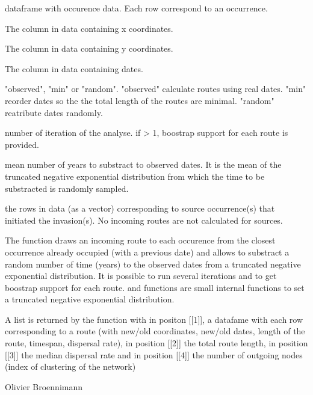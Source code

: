 \documentclass[a4paper]{book}
\begin{document}
\begin{Arguments}
\begin{ldescription}
\item[\code{data}] dataframe with occurence data. Each row correspond to an occurrence.
\item[\code{xcol}] The column in data containing x coordinates.
\item[\code{ycol}] The column in data containing y coordinates.
\item[\code{datecol}] The column in data containing dates.
\item[\code{mode}] "observed", "min" or "random". "observed" calculate routes using real dates. "min" reorder dates so the the total length of the routes are minimal. "random" reatribute dates randomly.
\item[\code{rep}] number of iteration of the analyse. if > 1, boostrap support for each route is provided.
\item[\code{mean.date.error}] mean number of years to substract to observed dates. It is the mean of the truncated negative exponential distribution from which the time to be substracted is randomly sampled.
\item[\code{fixed.sources.rows}] the rows in data (as a vector) corresponding to source occurrence(s) that initiated the invasion(s). No incoming routes are not calculated for sources.
\end{ldescription}
\end{Arguments}
%
\begin{Details}\relax
The function draws an incoming route to each occurence from the closest occurrence already occupied (with a previous date) and allows to substract a random number of time (years) to the observed dates from a truncated negative exponential distribution. It is possible to run several iterations and to get boostrap support for each route.
 and  functions are small internal functions to set a truncated negative exponential distribution.
\end{Details}
%
\begin{Value}
A list is returned by the function with in positon [[1]], a datafame with each row corresponding to a route (with new/old coordinates, new/old dates, length of the route, timespan, dispersal rate), in position [[2]] the total route length, in position [[3]] the median dispersal rate and in position [[4]] the number of outgoing nodes (index of clustering of the network)
\end{Value}
%
\begin{Author}\relax
Olivier Broennimann 
\end{Author}
\end{document}

